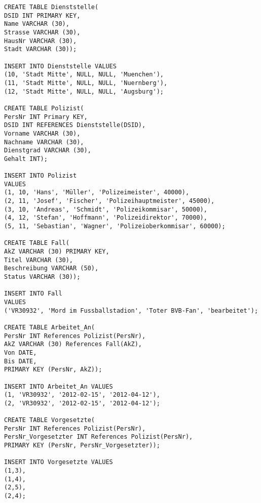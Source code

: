 \documentclass{lehramt-informatik-aufgabe}
\begin{document}
\begin{verbatim}
CREATE TABLE Dienststelle(
DSID INT PRIMARY KEY,
Name VARCHAR (30),
Strasse VARCHAR (30),
HausNr VARCHAR (30),
Stadt VARCHAR (30));

INSERT INTO Dienststelle VALUES
(10, 'Stadt Mitte', NULL, NULL, 'Muenchen'),
(11, 'Stadt Mitte', NULL, NULL, 'Nuernberg'),
(12, 'Stadt Mitte', NULL, NULL, 'Augsburg');

CREATE TABLE Polizist(
PersNr INT Primary KEY,
DSID INT REFERENCES Dienststelle(DSID),
Vorname VARCHAR (30),
Nachname VARCHAR (30),
Dienstgrad VARCHAR (30),
Gehalt INT);

INSERT INTO Polizist
VALUES
(1, 10, 'Hans', 'Müller', 'Polizeimeister', 40000),
(2, 11, 'Josef', 'Fischer', 'Polizeihauptmeister', 45000),
(3, 10, 'Andreas', 'Schmidt', 'Polizeikommisar', 50000),
(4, 12, 'Stefan', 'Hoffmann', 'Polizeidirektor', 70000),
(5, 11, 'Sebastian', 'Wagner', 'Polizeioberkommisar', 60000);

CREATE TABLE Fall(
AkZ VARCHAR (30) PRIMARY KEY,
Titel VARCHAR (30),
Beschreibung VARCHAR (50),
Status VARCHAR (30));

INSERT INTO Fall
VALUES
('VR30932', 'Mord im Fussballstadion', 'Toter BVB-Fan', 'bearbeitet');

CREATE TABLE Arbeitet_An(
PersNr INT References Polizist(PersNr),
AkZ VARCHAR (30) References Fall(AkZ),
Von DATE,
Bis DATE,
PRIMARY KEY (PersNr, AkZ));

INSERT INTO Arbeitet_An VALUES
(1, 'VR30932', '2012-02-15', '2012-04-12'),
(2, 'VR30932', '2012-02-15', '2012-04-12');

CREATE TABLE Vorgesetzte(
PersNr INT References Polizist(PersNr),
PersNr_Vorgesetzter INT References Polizist(PersNr),
PRIMARY KEY (PersNr, PersNr_Vorgesetzter));

INSERT INTO Vorgesetzte VALUES
(1,3),
(1,4),
(2,5),
(2,4);
\end{verbatim}
\end{document}
